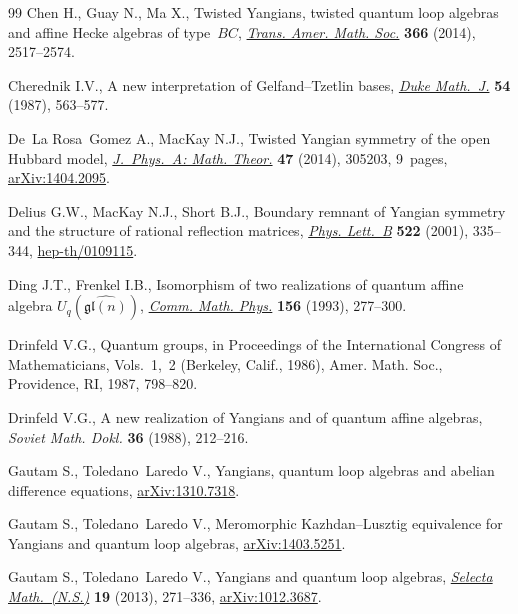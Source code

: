 \documentclass[pdftex]{sigma}
\numberwithin{theorem}{section}
\numberwithin{proposition}{section}
\numberwithin{lemma}{section}
\numberwithin{corollary}{section}
\numberwithin{definition}{section}
\numberwithin{example}{section}
\numberwithin{remark}{section}
\numberwithin{note}{section}
\numberwithin{equation}{section}
\begin{document}
\begin{thebibliography}{99}
Chen H., Guay N., Ma X., Twisted {Y}angians, twisted quantum loop algebras and
  af\/f\/ine {H}ecke algebras of type~{$BC$}, \href{http://dx.doi.org/10.1090/S0002-9947-2014-05994-1}{\textit{Trans. Amer. Math. Soc.}}
  \textbf{366} (2014), 2517--2574.

Cherednik I.V., A new interpretation of {G}elfand--{T}zetlin bases,
  \href{http://dx.doi.org/10.1215/S0012-7094-87-05423-8}{\textit{Duke Math.~J.}} \textbf{54} (1987), 563--577.

De~La Rosa~Gomez A., MacKay N.J., Twisted {Y}angian symmetry of the open
  {H}ubbard model, \href{http://dx.doi.org/10.1088/1751-8113/47/30/305203}{\textit{J.~Phys.~A: Math. Theor.}} \textbf{47} (2014),
  305203, 9~pages, \href{http://arxiv.org/abs/1404.2095}{arXiv:1404.2095}.

Delius G.W., MacKay N.J., Short B.J., Boundary remnant of {Y}angian symmetry
  and the structure of rational ref\/lection matrices, \href{http://dx.doi.org/10.1016/S0370-2693(01)01275-8}{\textit{Phys. Lett.~B}}
  \textbf{522} (2001), 335--344, \href{http://arxiv.org/abs/hep-th/0109115}{hep-th/0109115}.

Ding J.T., Frenkel I.B., Isomorphism of two realizations of quantum af\/f\/ine
  algebra {$U_q(\widehat{\mathfrak{gl}(n)})$}, \href{http://dx.doi.org/10.1007/BF02098484}{\textit{Comm. Math. Phys.}}
  \textbf{156} (1993), 277--300.

Drinfeld V.G., Quantum groups, in Proceedings of the {I}nternational {C}ongress
  of {M}athematicians, {V}ols.~1,~2 ({B}erkeley, {C}alif., 1986), Amer. Math.
  Soc., Providence, RI, 1987, 798--820.

Drinfeld V.G., A new realization of {Y}angians and of quantum af\/f\/ine algebras,
  \textit{Soviet Math. Dokl.} \textbf{36} (1988), 212--216.

Gautam S., Toledano~Laredo V., Yangians, quantum loop algebras and abelian
  dif\/ference equations, \href{http://arxiv.org/abs/1310.7318}{arXiv:1310.7318}.

Gautam S., Toledano~Laredo V., Meromorphic Kazhdan--Lusztig equivalence for
  Yangians and quantum loop algebras, \href{http://arxiv.org/abs/1403.5251}{arXiv:1403.5251}.


Gautam S., Toledano~Laredo V., Yangians and quantum loop algebras,
  \href{http://dx.doi.org/10.1007/s00029-012-0114-2}{\textit{Selecta Math.~(N.S.)}} \textbf{19} (2013), 271--336,
  \href{http://arxiv.org/abs/1012.3687}{arXiv:1012.3687}.


\end{thebibliography}
\end{document}
